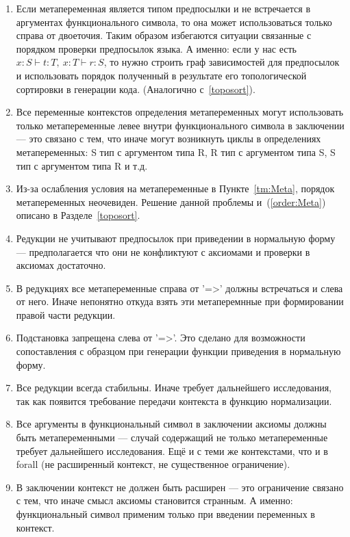 \begin{enumerate}
\item Если метапеременная является типом предпосылки и не встречается в аргументах функционального символа, то она может использоваться только справа от двоеточия. Таким образом избегаются ситуации связанные с порядком проверки предпосылок языка. А именно: если у нас есть $x : S \vdash t : T,\ x:T \vdash r : S$, то нужно строить граф зависимостей для предпосылок и использовать порядок полученный в результате его топологической сортировки в генерации кода. (Аналогично с~\ref{toposort}).

\item \label{order:Meta} Все переменные контекстов определения метапеременных могут использовать только метапеременные левее внутри функционального символа в заключении --- это связано с тем, что иначе могут возникнуть циклы в определениях метапеременных: S тип с аргументом типа R, R тип с аргументом типа S, S тип с аргументом типа R и т.д.

\item Из-за ослабления условия на метапеременные в Пункте~\ref{tm:Meta}, порядок метапеременных неочевиден. Решение данной проблемы и~(\ref{order:Meta}) описано в Разделе~\ref{toposort}.

\item Редукции не учитывают предпосылок при приведении в нормальную форму --- предполагается что они не конфликтуют с аксиомами и проверки в аксиомах достаточно.

\item В редукциях все метапеременные справа от '=>' должны встречаться и слева от него. Иначе непонятно откуда взять эти метаперемнные при формировании правой части редукции.

\item Подстановка запрещена слева от '=>'. Это сделано для возможности сопоставления с образцом при генерации функции приведения в нормальную форму.

\item Все редукции всегда стабильны. Иначе требует дальнейшего исследования, так как появится требование передачи контекста в функцию нормализации.

\item Все аргументы в функциональный символ в заключении аксиомы должны быть метапеременными --- случай содержащий не только метапеременные требует дальнейшего исследования. Ещё и с теми же контекстами, что и в forall (не расширенный контекст, не существенное ограничение).

\item В заключении контекст не должен быть расширен --- это ограничение связано с тем, что иначе смысл аксиомы становится странным. А именно: функциональный символ применим только при введении переменных в контекст.

\end{enumerate}

